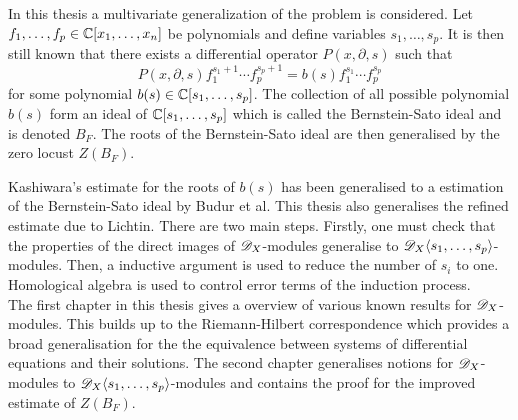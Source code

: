 In this thesis a multivariate generalization of the problem is considered.
Let $f_1,\ldots, f_p \in \mathbb{C}[x_1,\ldots, x_n]$ be polynomials and define variables $s_1,\ldots, s_p$.
It is then still known that there exists a differential operator $P(x,\partial, s)$ such that
$$P(x,\partial,s) f_1^{s_1 + 1}\cdots f_p^{s_p + 1} = b(s)f_1^{s_1}\cdots f_p^{s_p}$$
for some polynomial $b(s) \in \mathbb{C}[s_1,\ldots, s_p]$.
The collection of all possible polynomial $b(s)$ form an ideal of $\mathbb{C}[s_1,\ldots,s_p]$ which is called the Bernstein-Sato ideal and is denoted $B_{F}$.
The roots of the Bernstein-Sato ideal are then generalised by the zero locust $Z(B_F)$.

Kashiwara's estimate for the roots of $b(s)$ has been generalised to a estimation of the Bernstein-Sato ideal by Budur et al.
This thesis also generalises the refined estimate due to Lichtin.
There are two main steps.
Firstly, one must check that the properties of the direct images of $\mathscr{D}_X$-modules generalise to $\mathscr{D}_X\langle s_1,\ldots, s_p \rangle$-modules.
Then, a inductive argument is used to reduce the number of $s_i$ to one.
Homological algebra is used to control error terms of the induction process.\\

The first chapter in this thesis gives a overview of various known results for $\mathscr{D}_X$-modules.
This builds up to the Riemann-Hilbert correspondence which provides a broad generalisation for the the equivalence between systems of differential equations and their solutions.
The second chapter generalises notions for $\mathscr{D}_X$-modules to $\mathscr{D}_X\langle s_1,\ldots, s_p \rangle$-modules and contains the proof for the improved estimate of $Z(B_F)$.
